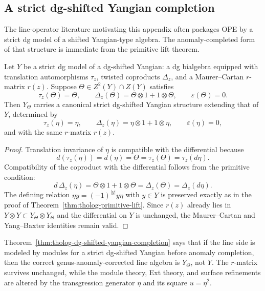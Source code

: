 \subsection{A strict dg-shifted Yangian completion}
\label{subsec:tholog-strict-dg-shifted-yangian}

The line-operator literature motivating this appendix often packages OPE by a strict dg model of a shifted Yangian-type algebra.
The anomaly-completed form of that structure is immediate from the primitive lift theorem.

\begin{theorem}
\label{thm:tholog-dg-shifted-yangian-completion}
Let \(Y\) be a strict dg model of a dg-shifted Yangian: a dg bialgebra equipped with translation automorphisms \(\tau_{z}\), twisted coproducts \(\Delta_{z}\), and a Maurer--Cartan \(r\)-matrix \(r(z)\).
Suppose \(\Theta\in Z^{2}(Y)\cap Z(Y)\) satisfies
\[
\tau_{z}(\Theta)=\Theta,\qquad
\Delta_{z}(\Theta)=\Theta\otimes 1+1\otimes \Theta,\qquad
\varepsilon(\Theta)=0.
\]
Then \(Y_{\Theta}\) carries a canonical strict dg-shifted Yangian structure extending that of \(Y\), determined by
\[
\tau_{z}(\eta)=\eta,\qquad
\Delta_{z}(\eta)=\eta\otimes 1+1\otimes \eta,\qquad
\varepsilon(\eta)=0,
\]
and with the same \(r\)-matrix \(r(z)\).
\end{theorem}

\begin{proof}
Translation invariance of \(\eta\) is compatible with the differential because
\[
d(\tau_{z}(\eta))=d(\eta)=\Theta=\tau_{z}(\Theta)=\tau_{z}(d\eta).
\]
Compatibility of the coproduct with the differential follows from the primitive condition:
\[
d\,\Delta_{z}(\eta)=\Theta\otimes 1+1\otimes \Theta=\Delta_{z}(\Theta)=\Delta_{z}(d\eta).
\]
The defining relation \(\eta y=(-1)^{|y|}y\eta\) with \(y\in Y\) is preserved exactly as in the proof of Theorem~\ref{thm:tholog-primitive-lift}.
Since \(r(z)\) already lies in \(Y\otimes Y\subset Y_{\Theta}\otimes Y_{\Theta}\) and the differential on \(Y\) is unchanged, the Maurer--Cartan and Yang--Baxter identities remain valid.
\end{proof}

\begin{remark}[Interpretation]
\label{rem:tholog-yangian-interpretation}
Theorem~\ref{thm:tholog-dg-shifted-yangian-completion} says that if the line side is modeled by modules for a strict dg-shifted Yangian before anomaly completion, then the correct genus-anomaly-corrected line algebra is \(Y_{\Theta}\), not \(Y\).
The \(r\)-matrix survives unchanged, while the module theory, Ext theory, and surface refinements are altered by the transgression generator \(\eta\) and its square \(u=\eta^{2}\).
\end{remark}

